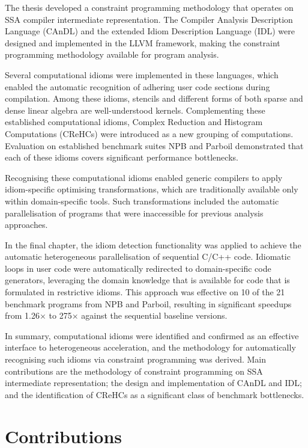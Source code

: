 
    The thesis developed a constraint programming methodology that operates on
    SSA compiler intermediate representation.
    The Compiler Analysis Description Language (CAnDL) and the extended Idiom
    Description Language (IDL) were designed and implemented in the LLVM
    framework, making the constraint programming methodology available for
    program analysis.

    Several computational idioms were implemented in these languages, which
    enabled the automatic recognition of adhering user code sections during
    compilation.
    Among these idioms, stencils and different forms of both sparse and
    dense linear algebra are well-understood kernels.
    Complementing these established computational idioms, Complex Reduction and
    Histogram Computations (CReHCs) were introduced as a new grouping of
    computations.
    Evaluation on established benchmark suites NPB and Parboil demonstrated that
    each of these idioms covers significant performance bottlenecks.

    Recognising these computational idioms enabled generic compilers to apply
    idiom-specific optimising transformations, which are traditionally available
    only within domain-specific tools.
    Such transformations included the automatic parallelisation of programs that
    were inaccessible for previous analysis approaches.

    In the final chapter, the idiom detection functionality was applied to
    achieve the automatic heterogeneous parallelisation of sequential C/C++
    code.
    Idiomatic loops in user code were automatically redirected to
    domain-specific code generators, leveraging the domain knowledge that is
    available for code that is formulated in restrictive idioms.
    This approach was effective on 10 of the 21 benchmark programs from NPB and
    Parboil, resulting in significant speedups from 1.26$\times$  to 275$\times$
    against the sequential baseline versions.

    In summary, computational idioms were identified and confirmed as an
    effective interface to heterogeneous acceleration, and the methodology
    for automatically recognising such idioms via constraint programming was
    derived.
    Main contributions are the methodology of constraint programming on SSA
    intermediate representation; the design and implementation of CAnDL and IDL;
    and the identification of CReHCs as a significant class of benchmark
    bottlenecks.

\section{Contributions}

